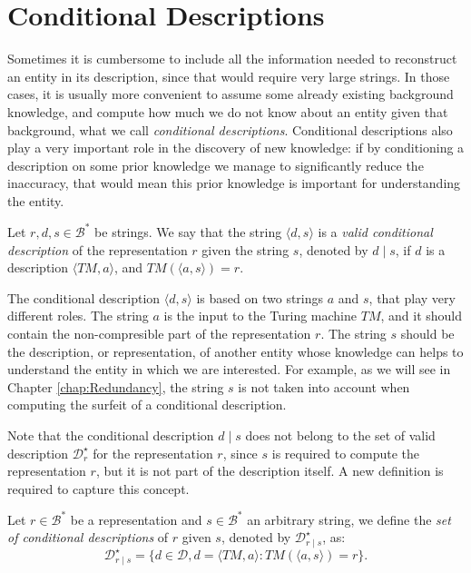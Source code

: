 %
%

\section{Conditional Descriptions}

Sometimes it is cumbersome to include all the information needed to reconstruct an entity in its description, since that would require very large strings. In those cases, it is usually more convenient to assume some already existing background knowledge, and compute how much we do not know about an entity given that background, what we call \emph{conditional descriptions}. Conditional descriptions also play a very important role in the discovery of new knowledge: if by conditioning a description on some prior knowledge we manage to significantly reduce the inaccuracy, that would mean this prior knowledge is important for understanding the entity.

\begin{definition}
Let $r, d, s \in \mathcal{B}^\ast$ be strings. We say that the string $\langle d, s \rangle$ is a \emph{valid conditional description} of the representation $r$ given the string $s$, denoted by $d \mid s$, if $d$ is a description $\langle TM, a \rangle$, and $TM \left(\langle a, s \rangle \right) = r$.
\end{definition}

The conditional description $\langle d, s \rangle$ is based on two strings $a$ and $s$, that play very different roles. The string $a$ is the input to the Turing machine $TM$,  and it should contain the non-compresible part of the representation $r$. The string $s$ should be the description, or representation, of another entity whose knowledge can helps to understand the entity in which we are interested. For example, as we will see in Chapter \ref{chap:Redundancy}, the string $s$ is not taken into account when computing the surfeit of a conditional description.

Note that the conditional description $d \mid s$ does not belong to the set of valid description $\mathcal{D}^\star_r$ for the representation $r$, since $s$ is required to compute the representation $r$, but it is not part of the description itself. A new definition is required to capture this concept.

\begin{definition}
Let $r \in \mathcal{B}^\ast$ be a representation and $s \in \mathcal{B}^\ast$ an arbitrary string, we define the \emph{set of conditional descriptions} of $r$ given $s$, denoted by $\mathcal{D}_{r \mid s}^\star$, as:
\[
\mathcal{D}_{r \mid s}^\star = \{ d \in \mathcal{D}, d = \langle TM, a \rangle : TM \left(\langle a, s \rangle \right) = r \}.
\]
\end{definition}

